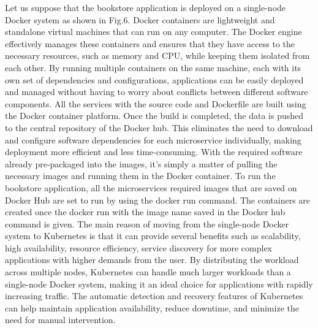 Let us suppose that the bookstore application is deployed on a single-node Docker system as shown in Fig.6. Docker containers are lightweight and standalone virtual machines that can run on any computer. The Docker engine effectively manages these containers and ensures that they have access to the necessary resources, such as memory and CPU, while keeping them isolated from each other. By running multiple containers on the same machine, each with its own set of dependencies and configurations, applications can be easily deployed and managed without having to worry about conflicts between different software components. All the services with the source code and Dockerfile are built using the Docker container platform. Once the build is completed, the data is pushed to the central repository of the Docker hub.  This eliminates the need to download and configure software dependencies for each microservice individually, making deployment more efficient and less time-consuming. With the required software already pre-packaged into the images, it's simply a matter of pulling the necessary images and running them in the Docker container. To run the bookstore application, all the microservices required images that are saved on Docker Hub are set to run by using the docker run command. The containers are created once the docker run with the image name saved in the Docker hub command is given. The main reason of moving from the single-node Docker system to Kubernetes is that it can provide several benefits such as scalability, high availability, resource efficiency, service discovery for more complex applications with higher demands from the user. By distributing the workload across multiple nodes, Kubernetes can handle much larger workloads than a single-node Docker system, making it an ideal choice for applications with rapidly increasing traffic. The automatic detection and recovery features of Kubernetes can help maintain application availability, reduce downtime, and minimize the need for manual intervention.

